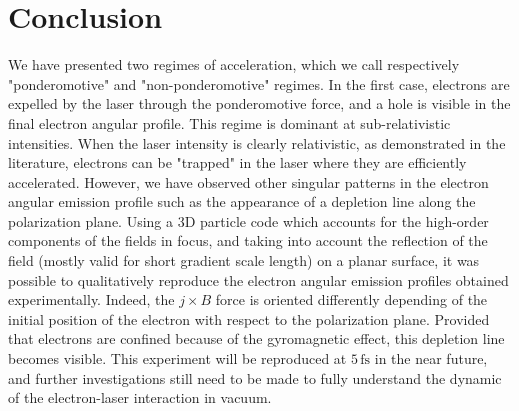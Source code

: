 \section{Conclusion}

We have presented two regimes of acceleration, which we call respectively "ponderomotive" and "non-ponderomotive" regimes. In the first case, electrons are expelled by the laser through the ponderomotive force, and a hole is visible in the final electron angular profile. This regime is dominant at sub-relativistic intensities. When the laser intensity is clearly relativistic, as demonstrated in the literature, electrons can be "trapped" in the laser where they are efficiently accelerated. However, we have observed other singular patterns in the electron angular emission profile such as the appearance of a depletion line along the polarization plane. Using a 3D particle code which accounts for the high-order components of the fields in focus, and taking into account the reflection of the field (mostly valid for short gradient scale length) on a planar surface, it was possible to qualitatively reproduce the electron angular emission profiles obtained experimentally. Indeed, the $j\times B$ force is oriented differently depending of the initial position of the electron with respect to the polarization plane. Provided that electrons are confined because of the gyromagnetic effect, this depletion line becomes visible. This experiment will be reproduced at $5\,\mathrm{fs}$ in the near future, and further investigations still need to be made to fully understand the dynamic of the electron-laser interaction in vacuum. 


















